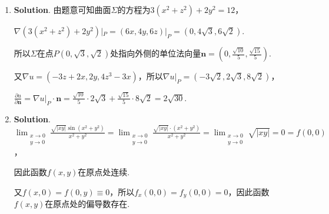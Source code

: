 \documentclass[../Main.tex]{subfiles}
\begin{document}
\begin{enumerate}
          则曲面$xy+z=0$在点$P_{0}(2,1,-2)$处切平面的法向量可以取为$\nabla F|_{P_0}= (
              1,2,1)$，

          切平面为$1\cdot(x-2)+2\cdot(y-1)+1\cdot(z+2)=0$，即$x+2y+z=2$.

          设经过直线$L$的平面束方程为$x+y+z-1+\lambda(2x+y+4z-2)=0$，

          即$(2\lambda+1)x + (\lambda+1)y + (4\lambda+1)z - (2\lambda+1)=0$，

          令其与切平面垂直，即$(2\lambda+1, \lambda+1, 4\lambda+1) \cdot (1,2,1) = 8\lambda
              + 4 = 0$，解得$\lambda = -\frac{1}{2}$，

          所以切平面上的投影直线的方程为$\begin{cases}
                  x+2y+z=2, \\
                  y-2z=0.
              \end{cases}$

    \item \textbf{Solution}. 由题意可知曲面$\Sigma$的方程为$3(x^{2}+z^{2})+2
              y^{2}=12$，

          $\nabla \left(3(x^{2}+z^{2})+2y^{2}\right)|_{P}= (6x, 4y, 6z)|_{P}= (0,4\sqrt{3}
              ,6\sqrt{2})$.

          所以$\Sigma$在点$P\left(0,\sqrt{3},\sqrt{2}\right)$处指向外侧的单位法向量$\boldsymbol
              {n}=\left(0,\frac{\sqrt{10}}{5},\frac{\sqrt{15}}{5}\right)$.

          又$\nabla u = (-3z+2x, 2y, 4z^{3}-3x)$，所以$\nabla u|_{P}= \left(-3\sqrt{2}
              , 2\sqrt{3}, 8\sqrt{2}\right)$，

          $\frac{\partial u}{\partial \boldsymbol{n}}= \nabla u|_{P}\cdot \boldsymbol
              {n}= \frac{\sqrt{10}}{5}\cdot 2\sqrt{3}+ \frac{\sqrt{15}}{5}\cdot 8\sqrt{2}
              = 2\sqrt{30}$.

    \item \textbf{Solution}. $\lim_{\substack{x\to 0 \\ y\to 0}}\frac{\sqrt{|xy|}\sin\left(x^{2}+y^{2}\right)}{x^{2}+y^{2}}
              =\lim_{\substack{x\to 0 \\ y\to 0}}\frac{\sqrt{|xy|}\cdot\left(x^{2}+y^{2}\right)}{x^{2}+y^{2}}
              = \lim_{\substack{x\to 0 \\ y\to 0}}\sqrt{|xy|}=0=f(0,0)$，

          因此函数$f(x,y)$在原点处连续.

          又$f(x,0)=f(0,y)\equiv 0$，所以$f_{x}(0,0)=f_{y}(0,0)=0$，因此函数$f(x,y)$在原点处的偏导数存在.


\end{enumerate}
\end{document}
